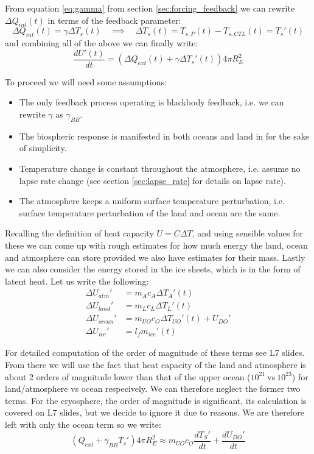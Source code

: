 From equation \ref{eq:gamma} from section \ref{sec:forcing_feedback} we can
rewrite $\Delta Q_{int}(t)$ in terms of the feedback parameter:
$$
\Delta Q_{int}(t) = \gamma \Delta T_s(t) \quad \implies \quad \Delta T_s(t) = 
T_{s,P}(t) - T_{s,CTL}(t) = T_s'(t)
$$
and combining all of the above we can finally write:
$$
\boxed{\frac{dU'(t)}{dt} = \left(\Delta Q_{ext}(t) + \gamma \Delta T_s'(t)\right)
4\pi R_E^2}
$$

\noindent To proceed we will need some assumptions:
\begin{itemize}
    \item The only feedback process operating is blackbody feedback, i.e. we can
    rewrite $\gamma$ as $\gamma_{BB}$.
    \item The biospheric response is manifested in both oceans and land in for
    the sake of simplicity.
    \item Temperature change is constant throughout the atmosphere, i.e. assume
    no lapse rate change (see section \ref{sec:lapse_rate} for details on lapse
    rate).
    \item The atmosphere keeps a uniform surface temperature perturbation, i.e.
    surface temperature perturbation of the land and ocean are the same.
\end{itemize}

Recalling the definition of heat capacity $U = C \Delta T$, and using sensible 
values for these we can come up with rough estimates for how much energy the 
land, ocean and atmosphere can store provided we also have estimates for their 
mass. Lastly we can also consider the energy stored in the ice sheets, which is
in the form of latent heat. Let us write the following:
\begin{align}
    \Delta U_{atm}' &= m_{A}c_{A} \Delta T_{A}'(t) \nonumber \\
    \Delta U_{land}' &= m_{L}c_{L} \Delta T_{L}'(t) \nonumber \\
    \Delta U_{ocean}' &= m_{UO}c_{O} \Delta T_{UO}'(t) 
    + U_{DO}' \nonumber \\
    \Delta U_{ice}' &= l_fm_{ice}'(t) \nonumber
\end{align}

For detailed computation of the order of magnitude of these terms see L7 slides.
From there we will use the fact that heat capacity of the land and atmosphere is
about 2 orders of magnitude lower than that of the upper ocean ($10^{21}\ \text{vs}
\ 10^{23}$) for land/atmosphere vs ocean respecively. We can therefore neglect the 
former two terms. For the cryosphere, the order of magnitude is significant, its
calculation is covered on L7 slides, but we decide to ignore it due to reasons. 
We are therefore left with only the ocean term so 
we write:
$$
\boxed{
(Q_{ext} + \gamma_{BB} T_s') 4\pi R_E^2 \approx m_{UO}c_{O} \frac{dT_S'}{dt} + 
\frac{dU_{DO}'}{dt}} 
$$ \label{eq:energy_balance}

